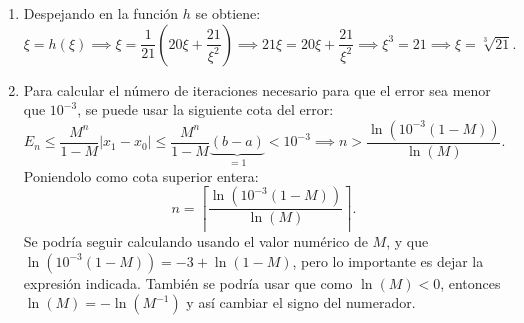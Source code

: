 {\begin{enumerate}[label=\alph*)]
\[\begin{cases}
            \end{cases}
        \]
        Dejando así claro que $h(1) > 2$, $h(2) \in (2,3)$ y $h(3) \in (2,3)$. Por lo tanto, el intervalo que nos interesa es $[2,3]$ (el $[1,2]$ no es adecuado porque $h(1) > 2$). Ahora, para calcular la norma de la derivada:
        \[
            h'' = \frac{6}{x^4} > 0 \implies 
            h' \text{ es creciente} \implies
            \|h'\|_\infty = \max_{x \in [2,3]} h'(x) = h'(3) = \frac{20}{21} - \frac{2}{27} = \frac{520}{567} < 1.
        \]
        \item Despejando en la función $h$ se obtiene:
        \[
            \xi = h(\xi) \implies
            \xi = \frac{1}{21}\left(20\xi + \frac{21}{\xi^2}\right) \implies
            21\xi = 20\xi + \frac{21}{\xi^2} \implies
            \xi^3 = 21 \implies
            \xi = \sqrt[3]{21}.
        \]
        \item Para calcular el número de iteraciones necesario para que el error sea menor que $10^{-3}$, se puede usar la siguiente cota del error:
        \[
            E_n \leq \frac{M^n}{1 - M} |x_1 - x_0| \leq \frac{M^n}{1 - M}\underbrace{(b-a)}_{=1} < 10^{-3} \implies
            n > \frac{\ln\left(10^{-3}(1 - M)\right)}{\ln(M)}.
        \]
        Poniendolo como cota superior entera:
        \[
        \boxed{
            n = \left\lceil \frac{\ln\left(10^{-3}(1 - M)\right)}{\ln(M)} \right\rceil.
        }
        \]
        Se podría seguir calculando usando el valor numérico de $M$, y que $\ln(10^{-3}(1 - M)) = -3 + \ln(1 - M)$, pero lo importante es dejar la expresión indicada. También se podría usar que como $\ln(M) < 0$, entonces $\ln(M) = - \ln(M^{-1})$ y así cambiar el signo del numerador.
    \end{enumerate}
}

